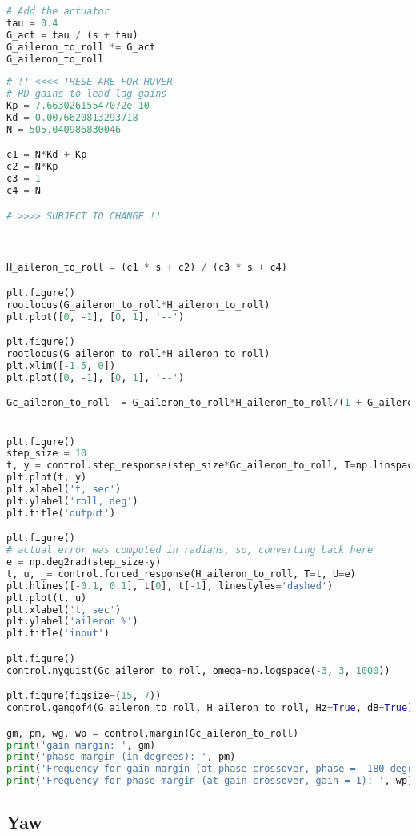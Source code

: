 \begin{lstlisting}[language=Python]
# Add the actuator 
tau = 0.4
G_act = tau / (s + tau)
G_aileron_to_roll *= G_act
G_aileron_to_roll
\end{lstlisting}

\begin{lstlisting}[language=Python]
# !! <<<< THESE ARE FOR HOVER 
# PD gains to lead-lag gains 
Kp = 7.66302615547072e-10
Kd = 0.0076620813293718
N = 505.040986830046

c1 = N*Kd + Kp
c2 = N*Kp
c3 = 1
c4 = N

# >>>> SUBJECT TO CHANGE !!



H_aileron_to_roll = (c1 * s + c2) / (c3 * s + c4)

plt.figure()
rootlocus(G_aileron_to_roll*H_aileron_to_roll)
plt.plot([0, -1], [0, 1], '--')

plt.figure()
rootlocus(G_aileron_to_roll*H_aileron_to_roll)
plt.xlim([-1.5, 0])
plt.plot([0, -1], [0, 1], '--')

Gc_aileron_to_roll  = G_aileron_to_roll*H_aileron_to_roll/(1 + G_aileron_to_roll*H_aileron_to_roll)


plt.figure()
step_size = 10
t, y = control.step_response(step_size*Gc_aileron_to_roll, T=np.linspace(0, 30, 1000))
plt.plot(t, y)
plt.xlabel('t, sec')
plt.ylabel('roll, deg')
plt.title('output')

plt.figure()
# actual error was computed in radians, so, converting back here
e = np.deg2rad(step_size-y)
t, u, _= control.forced_response(H_aileron_to_roll, T=t, U=e)
plt.hlines([-0.1, 0.1], t[0], t[-1], linestyles='dashed')
plt.plot(t, u)
plt.xlabel('t, sec')
plt.ylabel('aileron %')
plt.title('input')

plt.figure()
control.nyquist(Gc_aileron_to_roll, omega=np.logspace(-3, 3, 1000))

plt.figure(figsize=(15, 7))
control.gangof4(G_aileron_to_roll, H_aileron_to_roll, Hz=True, dB=True)

gm, pm, wg, wp = control.margin(Gc_aileron_to_roll)
print('gain margin: ', gm)
print('phase margin (in degrees): ', pm)
print('Frequency for gain margin (at phase crossover, phase = -180 degrees): ', wg)
print('Frequency for phase margin (at gain crossover, gain = 1): ', wp)
\end{lstlisting}

\hypertarget{yaw-1}{%
\subsection{Yaw}\label{yaw-1}}

